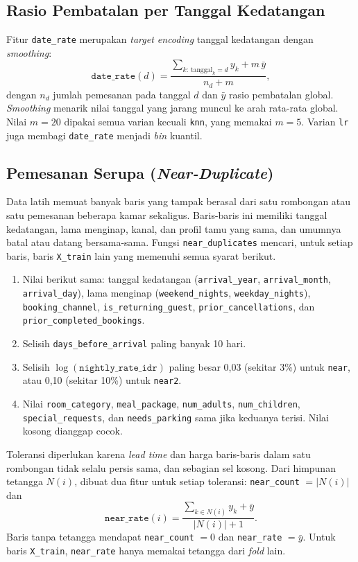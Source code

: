 \subsection{Rasio Pembatalan per Tanggal Kedatangan}

Fitur \texttt{date\_rate} merupakan \textit{target encoding} tanggal kedatangan
dengan \textit{smoothing}:
\begin{equation}
	\label{eq:te}
	\texttt{date\_rate}(d)=\frac{\sum_{k:\,\text{tanggal}_k=d}y_k+m\,\bar{y}}{n_d+m},
\end{equation}
dengan $n_d$ jumlah pemesanan pada tanggal $d$ dan $\bar{y}$ rasio pembatalan
global. \textit{Smoothing} menarik nilai tanggal yang jarang muncul ke arah
rata-rata global. Nilai $m=20$ dipakai semua varian kecuali \texttt{knn}, yang
memakai $m=5$. Varian \texttt{lr} juga membagi \texttt{date\_rate} menjadi
\textit{bin} kuantil.

\subsection{Pemesanan Serupa (\textit{Near-Duplicate})}

Data latih memuat banyak baris yang tampak berasal dari satu rombongan atau satu
pemesanan beberapa kamar sekaligus. Baris-baris ini memiliki tanggal kedatangan,
lama menginap, kanal, dan profil tamu yang sama, dan umumnya batal atau datang
bersama-sama. Fungsi \texttt{near\_duplicates} mencari, untuk setiap baris, baris
\texttt{X\_train} lain yang memenuhi semua syarat berikut.
\begin{enumerate}
	\item Nilai berikut sama: tanggal kedatangan (\texttt{arrival\_year},
	\texttt{arrival\_month}, \texttt{arrival\_day}), lama menginap
	(\texttt{weekend\_nights}, \texttt{weekday\_nights}), \texttt{booking\_channel},
	\texttt{is\_returning\_guest}, \texttt{prior\_cancellations}, dan
	\texttt{prior\_completed\_bookings}.
	\item Selisih \texttt{days\_before\_arrival} paling banyak 10 hari.
	\item Selisih $\log(\texttt{nightly\_rate\_idr})$ paling besar 0,03 (sekitar
	3\%) untuk \texttt{near}, atau 0,10 (sekitar 10\%) untuk \texttt{near2}.
	\item Nilai \texttt{room\_category}, \texttt{meal\_package},
	\texttt{num\_adults}, \texttt{num\_children}, \texttt{special\_requests}, dan
	\texttt{needs\_parking} sama jika keduanya terisi. Nilai kosong dianggap cocok.
\end{enumerate}
Toleransi diperlukan karena \textit{lead time} dan harga baris-baris dalam satu
rombongan tidak selalu persis sama, dan sebagian sel kosong. Dari himpunan
tetangga $N(i)$, dibuat dua fitur untuk setiap toleransi:
\texttt{near\_count} $=|N(i)|$ dan
\begin{equation}
	\texttt{near\_rate}(i)=\frac{\sum_{k\in N(i)}y_k+\bar{y}}{|N(i)|+1}.
\end{equation}
Baris tanpa tetangga mendapat \texttt{near\_count} $=0$ dan \texttt{near\_rate}
$=\bar{y}$. Untuk baris \texttt{X\_train}, \texttt{near\_rate} hanya memakai
tetangga dari \textit{fold} lain.

